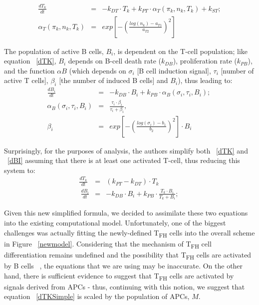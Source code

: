 \documentclass[a4paper, 12pt]{report}
\begin{document}
\begin{eqnarray}
\frac{dT_k}{dt} &=& -k_{DT} \cdot T_k + k_{PT} \cdot \alpha_{T}(\pi_{k}, n_{k}, T_{k}) + k_{ST}; \label{dTK} \\
\alpha_{T}(\pi_{k}, n_{k}, T_{k}) &=& exp\left[-\left(\frac{log(n_{k}) - a_{T1}}{a_{T2}}\right)^{2}\right]
\end{eqnarray}

The population of active B cells, $B_{i}$, is dependent on the T-cell population; like equation ~\ref{dTK}, $B_{i}$ depends on B-cell death rate ($k_{DB}$), proliferation rate ($k_{PB}$), and the function $\alpha{B}$ (which depends on $\sigma_{i}$ [B cell induction signal], $\tau_{i}$ [number of active T cells], $\beta_{i}$ [the number of induced B cells] and $B_{i}$), thus leading to:
\begin{eqnarray}
\frac{dB_i}{dt} &=& -k_{DB} \cdot B_i + k_{PB} \cdot \alpha_{B}(\sigma_{i}, \tau_{i}, B_{i}); ~\label{dBI} \\
\alpha_{B}(\sigma_{i}, \tau_{i}, B_{i}) &=& \frac{\tau_{i}\cdot{\beta_{i}}}{\tau_{i} + \beta_{i}}, \\
\beta_{i} &=&  exp\left[-\left(\frac{log(\sigma_{i}) - b_{1}}{b_{2}}\right)^{2}\right] \cdot B_{i}
\end{eqnarray}

Surprisingly, for the purposes of analysis, the authors simplify both ~\ref{dTK} and ~\ref{dBI} assuming that there is at least one activated T-cell, thus reducing this system to:
\begin{eqnarray}
\frac{dT_k}{dt} &=& (k_{PT}-k_{DT}) \cdot T_k \\ ~\label{dTKSimple}
\frac{dB_i}{dt} &=& -k_{DB} \cdot B_i + k_{PB} \cdot \frac{T_{k} \cdot B_{i}}{T_{k}+B_{i}}; ~\label{dBISimple}
\end{eqnarray}

Given this new simplified formula, we decided to assimilate these two equations into the existing computational model. Unfortunately, one of the biggest challenges was actually fitting the newly-defined T\textsubscript{FH} cells into the overall scheme in Figure ~\ref{newmodel}. Considering that the mechanism of T\textsubscript{FH} cell differentiation remains undefined and the possibility that T\textsubscript{FH} cells are activated by B cells ~\cite{Crotty}, the equations that we are using may be inaccurate. On the other hand, there is sufficient evidence to suggest that T\textsubscript{FH} cells are activated by signals derived from APCs - thus, continuing with this notion, we suggest that equation ~\ref{dTKSimple} is scaled by the population of APCs, $M$.
\end{document}
